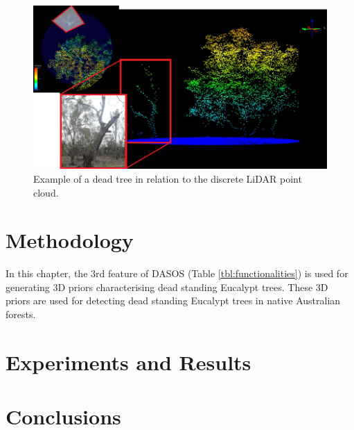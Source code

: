 \documentclass{subfiles}
\begin{document}
	\begin{figure} [h!]
		\centering
		\includegraphics[width=\textwidth]{img/DeadTreeInLiDAR}
		\caption{Example of a dead tree in relation to the discrete LiDAR point cloud.}
		\label{fig:DeadTreeInLiDAR}
		\end{figure}
		
		
		

\section{Methodology}

\par In this chapter, the 3rd feature of DASOS (Table \ref{tbl:functionalities}) is used for generating 3D priors characterising dead standing Eucalypt trees. These 3D priors are used for detecting dead standing Eucalypt trees in native Australian forests. 

\section{Experiments and Results}

\section{Conclusions}
\end{document}
